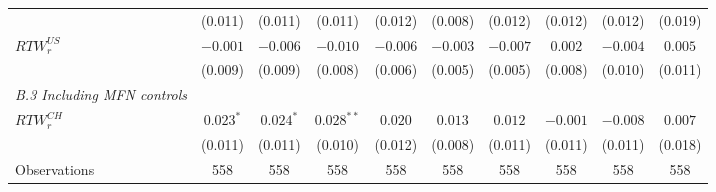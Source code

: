 \begin{tabular}{l*{9}{c}}
 & (0.011) & (0.011) & (0.011) & (0.012) & (0.008) & (0.012) & (0.012) & (0.012) & (0.019) \\[2pt]
$RTW_r^{US}$ & $-0.001$ & $-0.006$ & $-0.010$ & $-0.006$ & $-0.003$ & $-0.007$ & $0.002$ & $-0.004$ & $0.005$ \\
 & (0.009) & (0.009) & (0.008) & (0.006) & (0.005) & (0.005) & (0.008) & (0.010) & (0.011) \\[2pt]
\textit{B.3 Including MFN controls} \\
$RTW_r^{CH}$ & $0.023^{*}$ & $0.024^{*}$ & $0.028^{**}$ & $0.020$ & $0.013$ & $0.012$ & $-0.001$ & $-0.008$ & $0.007$ \\
 & (0.011) & (0.011) & (0.010) & (0.012) & (0.008) & (0.011) & (0.011) & (0.011) & (0.018) \\[2pt]
\midrule
Observations & 558 & 558 & 558 & 558 & 558 & 558 & 558 & 558 & 558 \\
\bottomrule
\end{tabular}
